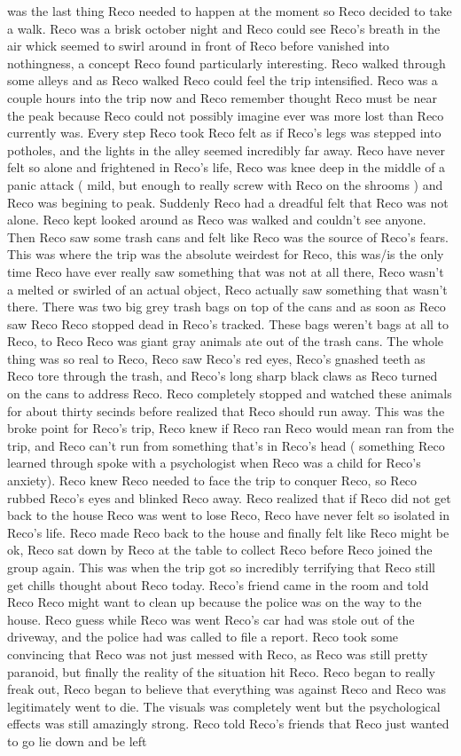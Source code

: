 \documentclass[12pt]{book}
\begin{document}
was the last thing Reco needed to happen at the moment so Reco decided to take a walk. Reco was a brisk october night and Reco could see Reco's breath in the air whick seemed to swirl around in front of Reco before vanished into nothingness, a concept Reco found particularly interesting. Reco walked through some alleys and as Reco walked Reco could feel the trip intensified. Reco was a couple hours into the trip now and Reco remember thought Reco must be near the peak because Reco could not possibly imagine ever was more lost than Reco currently was. Every step Reco took Reco felt as if Reco's legs was stepped into potholes, and the lights in the alley seemed incredibly far away. Reco have never felt so alone and frightened in Reco's life, Reco was knee deep in the middle of a panic attack ( mild, but enough to really screw with Reco on the shrooms ) and Reco was begining to peak. Suddenly Reco had a dreadful felt that Reco was not alone. Reco kept looked around as Reco was walked and couldn't see anyone. Then Reco saw some trash cans and felt like Reco was the source of Reco's fears. This was where the trip was the absolute weirdest for Reco, this was/is the only time Reco have ever really saw something that was not at all there, Reco wasn't a melted or swirled of an actual object, Reco actually saw something that wasn't there. There was two big grey trash bags on top of the cans and as soon as Reco saw Reco Reco stopped dead in Reco's tracked. These bags weren't bags at all to Reco, to Reco Reco was giant gray animals ate out of the trash cans. The whole thing was so real to Reco, Reco saw Reco's red eyes, Reco's gnashed teeth as Reco tore through the trash, and Reco's long sharp black claws as Reco turned on the cans to address Reco. Reco completely stopped and watched these animals for about thirty secinds before realized that Reco should run away. This was the broke point for Reco's trip, Reco knew if Reco ran Reco would mean ran from the trip, and Reco can't run from something that's in Reco's head ( something Reco learned through spoke with a psychologist when Reco was a child for Reco's anxiety). Reco knew Reco needed to face the trip to conquer Reco, so Reco rubbed Reco's eyes and blinked Reco away. Reco realized that if Reco did not get back to the house Reco was went to lose Reco, Reco have never felt so isolated in Reco's life. Reco made Reco back to the house and finally felt like Reco might be ok, Reco sat down by Reco at the table to collect Reco before Reco joined the group again. This was when the trip got so incredibly terrifying that Reco still get chills thought about Reco today. Reco's friend came in the room and told Reco Reco might want to clean up because the police was on the way to the house. Reco guess while Reco was went Reco's car had was stole out of the driveway, and the police had was called to file a report. Reco took some convincing that Reco was not just messed with Reco, as Reco was still pretty paranoid, but finally the reality of the situation hit Reco. Reco began to really freak out, Reco began to believe that everything was against Reco and Reco was legitimately went to die. The visuals was completely went but the psychological effects was still amazingly strong. Reco told Reco's friends that Reco just wanted to go lie down and be left 
\end{document}
